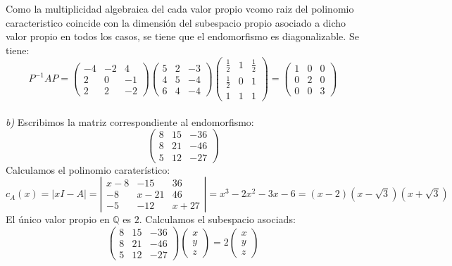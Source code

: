 \documentclass{article}
\begin{document}
Como la multiplicidad algebraica del cada valor propio vcomo raiz del polinomio caracteristico coincide con la dimensión del subespacio propio asociado a dicho valor propio en todos los casos, se tiene que el endomorfismo es diagonalizable. Se tiene:
$$
P^{-1}AP =
\left( \begin{array}{ccc}
    -4 & -2 & 4\\
    2 & 0 & -1\\
    2 & 2 & -2
\end{array} \right)
\left( \begin{array}{ccc}
    5 & 2 & -3\\
    4 & 5 & -4\\
    6 & 4 & -4
\end{array} \right)
\left( \begin{array}{ccc}
    \frac{1}{2} &  1 & \frac{1}{2}\\
    \frac{1}{2} &  0 & 1\\
    1 & 1 & 1
\end{array} \right) =
\left( \begin{array}{ccc}
    1 & 0 & 0\\
    0 & 2 & 0\\
    0 & 0 & 3
\end{array} \right)
$$\\
%
%
%
%
\textit{b)}
Escribimos la matriz correspondiente al endomorfismo:\\
$$
\left( \begin{array}{ccc}
    8 & 15 & -36\\
    8 & 21 & -46\\
    5 & 12 & -27
\end{array} \right)
$$
Calculamos el polinomio caraterístico:
$$
c_A(x) = |xI-A| = 
\left| \begin{array}{ccc}
    x-8 & -15 & 36\\
    -8 & x-21 & 46\\
    -5 & -12 & x+27
\end{array} \right| =
x^3-2x^2-3x-6 = (x-2)(x-\sqrt{3})(x+\sqrt{3})
$$
El único valor propio en $\mathbb{Q}$ es $2$. Calculamos el subespacio asociads:\
$$
\left( \begin{array}{ccc}
    8 & 15 & -36\\
    8 & 21 & -46\\
    5 & 12 & -27
\end{array} \right)
\left( \begin{array}{c}
      x \\
      y \\
      z
\end{array} \right) = 2
\left( \begin{array}{c}
      x \\
      y \\
      z
\end{array} \right)
$$
\end{document}
